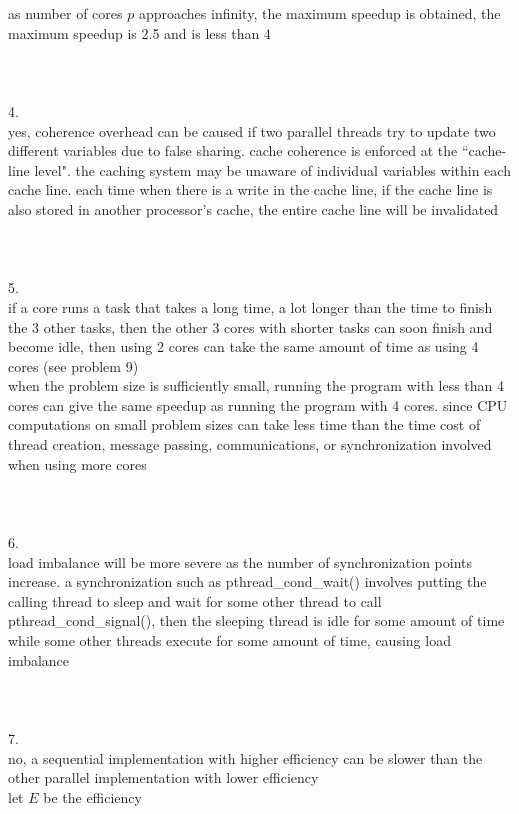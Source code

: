 \documentclass[12pt,border=4pt,multi]{article}%
\begin{document}
as number of cores $p$ approaches infinity, the maximum speedup is obtained, the maximum speedup is 2.5 and is less than 4\\
\\
\\
\\
4.\\
yes, coherence overhead can be caused if two parallel threads try to update two different variables due to false sharing. cache coherence is enforced at the ``cache-line level". the caching system may be unaware of individual variables within each cache line. each time when there is a write in the cache line, if the cache line is also stored in another processor's cache, the entire cache line will be invalidated\\
\\
\\
\\
5.\\
if a core runs a task that takes a long time, a lot longer than the time to finish the 3 other tasks, then the other 3 cores with shorter tasks can soon finish and become idle, then using 2 cores can take the same amount of time as using 4 cores (see problem 9)\\
when the problem size is sufficiently small, running the program with less than 4 cores can give the same speedup as running the program with 4 cores. since CPU computations on small problem sizes can take less time than the time cost of thread creation, message passing, communications, or synchronization involved when using more cores\\
\\
\\
\\
6.\\
load imbalance will be more severe as the number of synchronization points increase. a synchronization such as pthread\_cond\_wait() involves putting the calling thread to sleep and wait for some other thread to call pthread\_cond\_signal(), then the sleeping thread is idle for some amount of time while some other threads execute for some amount of time, causing load imbalance\\
\\
\\
\\
7.\\
no, a sequential implementation with higher efficiency can be slower than the other parallel implementation with lower efficiency\\
let $E$ be the efficiency\\
\end{document}
